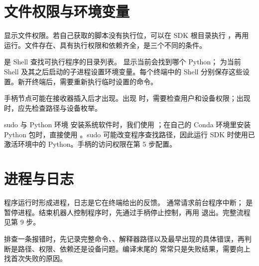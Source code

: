 \section{文件权限与环境变量}
 显示文件权限。若自己获取的脚本没有执行位，可以在 SDK 根目录执行 ，再用  运行。文件存在、具有执行权限和依赖齐全，是三个不同的条件。

 是 Shell 查找可执行程序的目录列表。 显示当前会找到哪个 Python； 为当前 Shell 及其之后启动的子进程设置环境变量。每个终端中的 Shell 分别保存这些设置。新开终端后，需要重新执行临时设置的命令。


手柄节点可能在接收器插入后才出现。出现  时，需要检查用户和设备权限；出现  时，应先检查路径与设备枚举。

\begin{remark}{sudo 与 Python 环境}
安装系统软件时，我们使用 ；在自己的 Conda 环境里安装 Python 包时，直接使用 。sudo 可能改变程序查找路径，因此运行 SDK 时使用已激活环境中的 Python。手柄的访问权限在第 5 步配置。
\end{remark}

\section{进程与日志}
程序运行时形成进程，日志是它在终端给出的反馈。 通常请求前台程序中断； 是暂停进程。结束机器人控制程序时，先通过手柄停止控制，再用  退出。完整流程见第 9 步。

排查一条报错时，先记录完整命令、、解释器路径以及最早出现的具体错误，再判断是路径、权限、依赖还是设备问题。编译末尾的  常常只是失败结果，需要向上找首次失败的原因。
